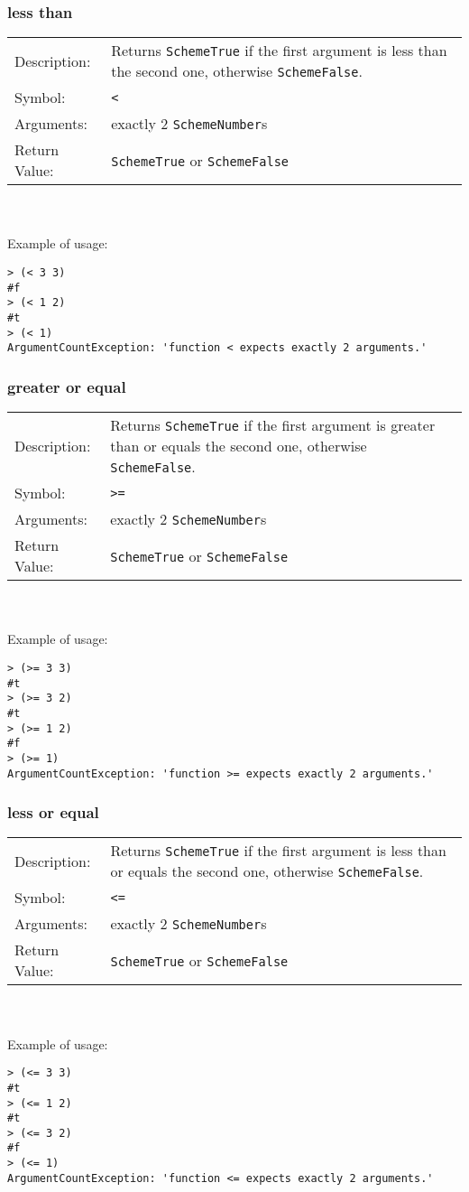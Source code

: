 \documentclass[12pt,a4paper]{scrartcl}
\begin{document}
\subsubsection{less than}
\begin{tabular}{l  p{13cm}}
Description: & Returns \lstinline{SchemeTrue} if the first argument is less than the second one, otherwise \lstinline{SchemeFalse}. \\
Symbol: & \lstinline{<}\\
Arguments: & exactly 2 \lstinline{SchemeNumber}s\\
Return Value: & \lstinline{SchemeTrue} or \lstinline{SchemeFalse}
\end{tabular}
\\
\\
Example of usage:
\begin{lstlisting}
> (< 3 3)
#f
> (< 1 2)
#t
> (< 1)
ArgumentCountException: 'function < expects exactly 2 arguments.'
\end{lstlisting}

\subsubsection{greater or equal}
\begin{tabular}{l  p{13cm}}
Description: & Returns \lstinline{SchemeTrue} if the first argument is greater than or equals the second one, otherwise \lstinline{SchemeFalse}. \\
Symbol: & \lstinline{>=}\\
Arguments: & exactly 2 \lstinline{SchemeNumber}s\\
Return Value: & \lstinline{SchemeTrue} or \lstinline{SchemeFalse}
\end{tabular}
\\
\\
Example of usage:
\begin{lstlisting}
> (>= 3 3)
#t
> (>= 3 2)
#t
> (>= 1 2)
#f
> (>= 1)
ArgumentCountException: 'function >= expects exactly 2 arguments.'
\end{lstlisting}

\subsubsection{less or equal}
\begin{tabular}{l  p{13cm}}
Description: & Returns \lstinline{SchemeTrue} if the first argument is less than or equals the second one, otherwise \lstinline{SchemeFalse}. \\
Symbol: & \lstinline{<=}\\
Arguments: & exactly 2 \lstinline{SchemeNumber}s\\
Return Value: & \lstinline{SchemeTrue} or \lstinline{SchemeFalse}
\end{tabular}
\\
\\
Example of usage:
\begin{lstlisting}
> (<= 3 3)
#t
> (<= 1 2)
#t
> (<= 3 2)
#f
> (<= 1)
ArgumentCountException: 'function <= expects exactly 2 arguments.'
\end{lstlisting}
\end{document}
